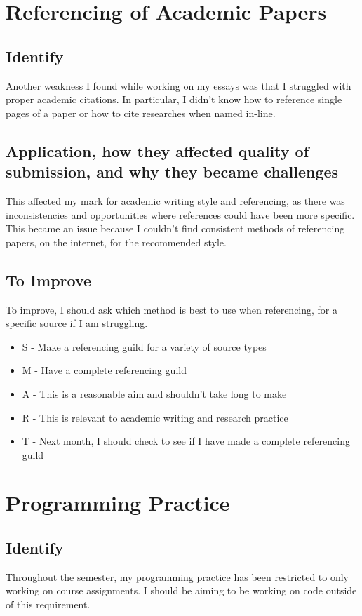 \documentclass{scrartcl}
\begin{document}
\section*{Referencing of Academic Papers}
\subsection*{Identify}
Another weakness I found while working on my essays was that I struggled with proper academic citations. In particular, I didn't know how to reference single pages of a paper or how to cite researches when named in-line.

\subsection*{Application, how they affected quality of submission, and why they became challenges}
This affected my mark for academic writing style and referencing, as there was inconsistencies and opportunities where references could have been more specific. This became an issue because I couldn't find consistent methods of referencing papers, on the internet, for the recommended style.  

\subsection*{To Improve}
To improve, I should ask which method is best to use when referencing, for a specific source if I am struggling.

 \begin{itemize}
   \item  S - Make a referencing guild for a variety of source types
	\item M - Have a complete referencing guild
	\item A - This is a reasonable aim and shouldn't take long to make
	\item R - This is relevant to academic writing and research practice
	\item T - Next month, I should check to see if I have made a complete referencing guild
 \end{itemize}

\section*{Programming Practice}
\subsection*{Identify}
Throughout the semester, my programming practice has been restricted to only working on course assignments. I should be aiming to be working on code outside of this requirement.
\end{document}
